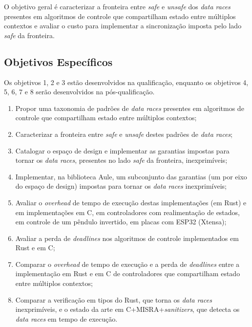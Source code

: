 O objetivo geral é caracterizar a fronteira entre \textit{safe} e \textit{unsafe} dos \textit{data races} presentes em algoritmos de controle que compartilham estado entre múltiplos contextos e avaliar o custo para implementar a sincronização imposta pelo lado \textit{safe} da fronteira.

\subsection{Objetivos Específicos}

Os objetivos 1, 2 e 3 estão desenvolvidos na qualificação, enquanto os objetivos 4, 5, 6, 7 e 8 serão desenvolvidos na pós-qualificação.

\begin{enumerate}
\item Propor uma taxonomia de padrões de \textit{data races} presentes em algoritmos de controle que compartilham estado entre múltiplos contextos;
\item Caracterizar a fronteira entre \textit{safe} e \textit{unsafe} destes padrões de \textit{data races};
\item Catalogar o espaço de design e implementar as garantias impostas para tornar os \textit{data races}, presentes no lado \textit{safe} da fronteira, inexprimíveis;
\end{enumerate}

\begin{enumerate}
\setcounter{enumi}{3}
\item Implementar, na biblioteca Aule, um subconjunto das garantias (um por eixo do espaço de design) impostas para tornar os \textit{data races} inexprimíveis;
\item Avaliar o \textit{overhead} de tempo de execução destas implementações (em Rust) e em implementações em C, em controladores com realimentação de estados, em controle de um pêndulo invertido, em placas com ESP32 (Xtensa);
\item Avaliar a perda de \textit{deadlines} nos algoritmos de controle implementados em Rust e em C;
\item Comparar o \textit{overhead} de tempo de execução e a perda de \textit{deadlines} entre a implementação em Rust e em C de controladores que compartilham estado entre múltiplos contextos;
\item Comparar a verificação em tipos do Rust, que torna os \textit{data races} inexprimíveis, e o estado da arte em C+\allowbreak MISRA+\allowbreak \textit{sanitizers}, que detecta os \textit{data races} em tempo de execução.
\end{enumerate}

